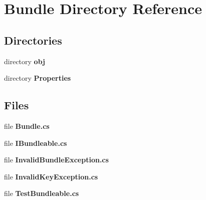\section{Bundle Directory Reference}
\label{dir_457db9356d2820800175587ca77eb54b}
\subsection*{Directories}
\begin{DoxyCompactItemize}
\item 
directory {\bf obj}
\item 
directory {\bf Properties}
\end{DoxyCompactItemize}
\subsection*{Files}
\begin{DoxyCompactItemize}
\item 
file {\bfseries Bundle.\+cs}
\item 
file {\bfseries I\+Bundleable.\+cs}
\item 
file {\bfseries Invalid\+Bundle\+Exception.\+cs}
\item 
file {\bfseries Invalid\+Key\+Exception.\+cs}
\item 
file {\bfseries Test\+Bundleable.\+cs}
\end{DoxyCompactItemize}
